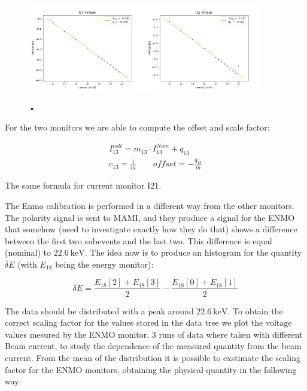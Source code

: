 \begin{figure}[hbtp]
\centering
\includegraphics[width = 0.45\textwidth]{Analysis/I13_Calibration.png}
\includegraphics[width = 0.45\textwidth]{Analysis/I21_Calibration.png} 
\caption{•}
\end{figure}

For the two monitors we are able to compute the offset and scale factor:

\begin{equation}
\begin{split}
I^{volt}_{13} = m_{13} \cdot I^{Nom}_{13} + q_{13}\\
c_{13} = \frac{1}{m} \qquad offset = -\frac{q_{13}}{m}
\end{split}
\end{equation}

The same formula for current monitor I21.

The Enmo calibration is performed in a different way from the other monitors. The polarity signal is sent to MAMI, and they produce a signal for the ENMO that somehow (need to investigate exactly how they do that) shows a difference between the first two subevents and the last two. This difference is equal (nominal) to $\SI{22.6}{\kilo \electronvolt}$. The idea now is to produce an histogram for the quantity $\delta E$ (with $E_{18}$ being the energy monitor):

\begin{equation*}
\delta E = \frac{E_{18}[2] + E_{18}[3]}{2} - \frac{E_{18}[0] + E_{18}[1]}{2} 
\end{equation*}

The data should be distributed with a peak around $\SI{22.6}{\kilo \electronvolt}$. To obtain the correct scaling factor for the values stored in the data tree we plot the voltage values mesured by the ENMO monitor.
3 runs of data where taken with different Beam current, to study the dependence of the measured quantity from the beam current. From the mean of the distribution it is possible to exstimate the scaling factor for the ENMO monitors, obtaining the physical quantity in the following way:

